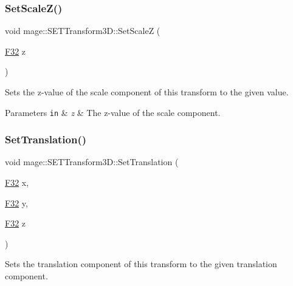 \subsubsection{\texorpdfstring{Set\+Scale\+Z()}{SetScaleZ()}}
{\footnotesize\ttfamily void mage\+::\+S\+E\+T\+Transform3\+D\+::\+Set\+ScaleZ (\begin{DoxyParamCaption}\item[{\mbox{\hyperlink{namespacemage_aa97e833b45f06d60a0a9c4fc22ae02c0}{F32}}}]{z }\end{DoxyParamCaption})\hspace{0.3cm}{\ttfamily [noexcept]}}

Sets the z-\/value of the scale component of this transform to the given value.


\begin{DoxyParams}[1]{Parameters}
\mbox{\tt in}  & {\em z} & The z-\/value of the scale component. \\
\hline
\end{DoxyParams}
\mbox{\label{classmage_1_1_s_e_t_transform3_d_a68feaf4412b6218de01c9beb79e0a000}} 
\subsubsection{\texorpdfstring{Set\+Translation()}{SetTranslation()}\hspace{0.1cm}{\footnotesize\ttfamily [1/3]}}
{\footnotesize\ttfamily void mage\+::\+S\+E\+T\+Transform3\+D\+::\+Set\+Translation (\begin{DoxyParamCaption}\item[{\mbox{\hyperlink{namespacemage_aa97e833b45f06d60a0a9c4fc22ae02c0}{F32}}}]{x,  }\item[{\mbox{\hyperlink{namespacemage_aa97e833b45f06d60a0a9c4fc22ae02c0}{F32}}}]{y,  }\item[{\mbox{\hyperlink{namespacemage_aa97e833b45f06d60a0a9c4fc22ae02c0}{F32}}}]{z }\end{DoxyParamCaption})\hspace{0.3cm}{\ttfamily [noexcept]}}

Sets the translation component of this transform to the given translation component.


